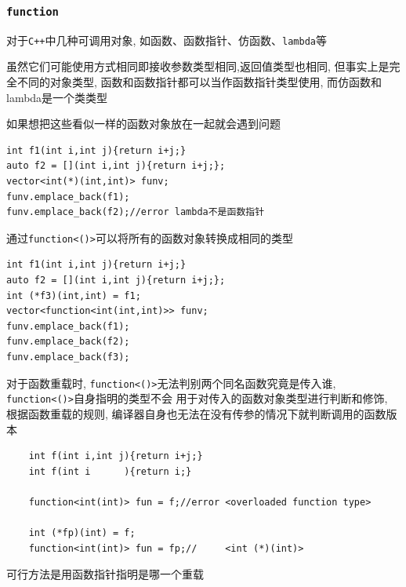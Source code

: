 \subsubsection{{\tt function}}
对于{\tt C++}中几种可调用对象, 如函数、函数指针、仿函数、{\tt lambda}等

虽然它们可能使用方式相同即接收参数类型相同,返回值类型也相同, 但事实上是完全不同的对象类型, 
	函数和函数指针都可以当作函数指针类型使用, 而仿函数和lambda是一个类类型

如果想把这些看似一样的函数对象放在一起就会遇到问题
\begin{lstlisting}
int f1(int i,int j){return i+j;}
auto f2 = [](int i,int j){return i+j;};
vector<int(*)(int,int)> funv;
funv.emplace_back(f1);
funv.emplace_back(f2);//error lambda不是函数指针
\end{lstlisting}

通过{\tt function<()>}可以将所有的函数对象转换成相同的类型
\begin{lstlisting}
int f1(int i,int j){return i+j;}
auto f2 = [](int i,int j){return i+j;};
int (*f3)(int,int) = f1;
vector<function<int(int,int)>> funv;
funv.emplace_back(f1);
funv.emplace_back(f2);
funv.emplace_back(f3);
\end{lstlisting}

对于函数重载时, {\tt function<()>}无法判别两个同名函数究竟是传入谁, {\tt function<()>}自身指明的类型不会
	用于对传入的函数对象类型进行判断和修饰, 根据函数重载的规则, 编译器自身也无法在没有传参的情况下就判断调用的函数版本
\begin{lstlisting}
	int f(int i,int j){return i+j;}
	int f(int i      ){return i;}
	
	function<int(int)> fun = f;//error <overloaded function type>

	int (*fp)(int) = f;
	function<int(int)> fun = fp;//     <int (*)(int)>
\end{lstlisting}

可行方法是用函数指针指明是哪一个重载


